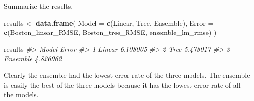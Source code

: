 \documentclass[
]{book}
\newenvironment{Shaded}{\begin{snugshade}}{\end{snugshade}}
\newcommand{\AttributeTok}[1]{\textcolor[rgb]{0.13,0.29,0.53}{#1}}
\newcommand{\CommentTok}[1]{\textcolor[rgb]{0.56,0.35,0.01}{\textit{#1}}}
\newcommand{\FunctionTok}[1]{\textcolor[rgb]{0.13,0.29,0.53}{\textbf{#1}}}
\newcommand{\NormalTok}[1]{#1}
\newcommand{\OtherTok}[1]{\textcolor[rgb]{0.56,0.35,0.01}{#1}}
\newcommand{\SpecialCharTok}[1]{\textcolor[rgb]{0.81,0.36,0.00}{\textbf{#1}}}
\newcommand{\StringTok}[1]{\textcolor[rgb]{0.31,0.60,0.02}{#1}}
\begin{document}
\begin{Shaded}
\end{Shaded}

Summarize the results.

\begin{Shaded}
\begin{Highlighting}[]
\NormalTok{results }\OtherTok{\textless{}{-}} \FunctionTok{data.frame}\NormalTok{(}
  \StringTok{\textquotesingle{}Model\textquotesingle{}} \OtherTok{=} \FunctionTok{c}\NormalTok{(}\StringTok{\textquotesingle{}Linear\textquotesingle{}}\NormalTok{, }\StringTok{\textquotesingle{}Tree\textquotesingle{}}\NormalTok{, }\StringTok{\textquotesingle{}Ensemble\textquotesingle{}}\NormalTok{),}
  \StringTok{\textquotesingle{}Error\textquotesingle{}} \OtherTok{=} \FunctionTok{c}\NormalTok{(Boston\_linear\_RMSE, Boston\_tree\_RMSE, ensemble\_lm\_rmse)}
\NormalTok{)}

\NormalTok{results}
\CommentTok{\#\textgreater{}      Model    Error}
\CommentTok{\#\textgreater{} 1   Linear 6.108005}
\CommentTok{\#\textgreater{} 2     Tree 5.478017}
\CommentTok{\#\textgreater{} 3 Ensemble 4.826962}
\end{Highlighting}
\end{Shaded}

Clearly the ensemble had the lowest error rate of the three models. The
ensemble is easily the best of the three models because it has the
lowest error rate of all the models.
\end{document}
